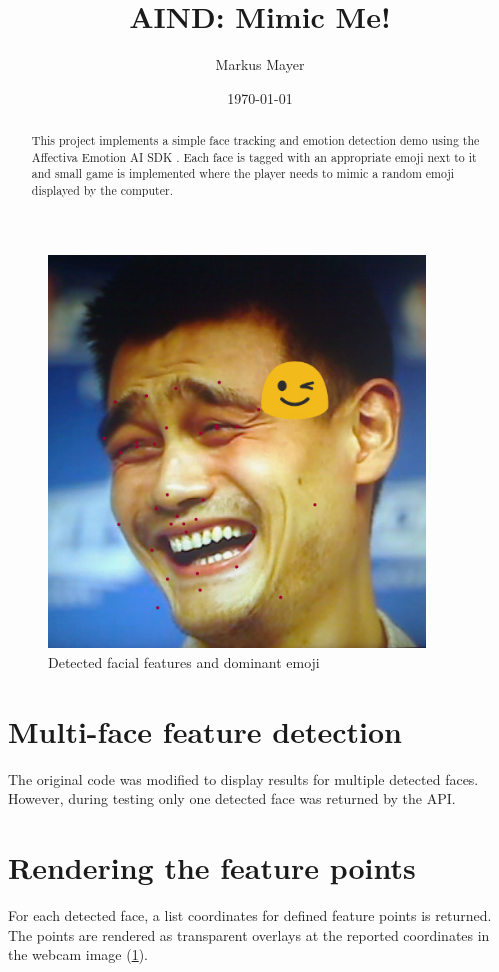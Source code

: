 \documentclass[12pt, a4paper, oneside]{article}
\title{AIND: Mimic Me!}
\author{Markus Mayer}
\date{\today}
\begin{document}
\maketitle

\begin{abstract}
  This project implements a simple face tracking and emotion detection demo using 
  the Affectiva Emotion AI SDK \cite{affectiva}. 
  Each face is tagged with an appropriate emoji next to it and small game is implemented
  where the player needs to mimic a random emoji displayed by the computer.
\end{abstract}

 \begin{figure}[!h]
  \centering
  \includegraphics[width=10cm]{images/laughing}
  \caption{Detected facial features and dominant emoji}
  \label{fig:laughing}
 \end{figure}

\section{Multi-face feature detection}

The original code was modified to display results for multiple detected faces.
However, during testing only one detected face was returned by the API.

\section{Rendering the feature points}

For each detected face, a list coordinates for defined feature points is returned.
The points are rendered as transparent overlays at the reported coordinates in the webcam image (\cref{fig:laughing}).
\end{document}
